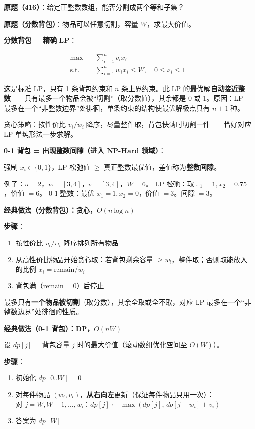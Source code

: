 \documentclass[12pt, a4paper]{ctexart}
\begin{document}
\begin{blackboard}

\textbf{原题（416）}：给定正整数数组，能否分割成两个等和子集？

\textbf{原题（分数背包）}：物品可以任意切割，容量 $W$，求最大价值。

\textbf{分数背包 = 精确 LP}：

\begin{align}
\max \quad & \sum_{i=1}^{n} v_i x_i \\
\text{s.t.} \quad & \sum_{i=1}^{n} w_i x_i \leq W,\quad 0 \leq x_i \leq 1
\end{align}

这是标准 LP，只有 1 条背包约束和 $n$ 条上界约束。此 LP 的最优解\textbf{自动接近整数}——只有最多一个物品会被``切割''（取分数值），其余都是 0 或 1。原因：LP 最多在一个``非整数边界''处徘徊，单条约束的结构使最优解极点只有 $n+1$ 种。

贪心策略：按性价比 $v_i/w_i$ 降序，尽量整件取，背包快满时切割一件——恰好对应 LP 单纯形法一步求解。

\textbf{0-1 背包 = 出现整数间隙（进入 NP-Hard 领域）}：

强制 $x_i \in \{0, 1\}$，LP 松弛值 $\geq$ 真正整数最优值，差值称为\textbf{整数间隙}。

例子：$n=2$，$w = [3, 4]$，$v = [3, 4]$，$W = 6$。
LP 松弛：取 $x_1=1, x_2=0.75$，价值 $= 6$。
0-1 整数：最优 $x_1=1, x_2=0$，价值 $= 3$。间隙 $= 3$。

\textbf{经典做法（分数背包）：贪心，$O(n\log n)$}

\textbf{步骤}：
\begin{enumerate}
    \item 按性价比 $v_i/w_i$ 降序排列所有物品
    \item 从高性价比物品开始贪心取：若背包剩余容量 $\geq w_i$，整件取；否则取能放入的比例 $x_i = \text{remain}/w_i$
    \item 背包满（$\text{remain}=0$）后停止
\end{enumerate}

最多只有\textbf{一个物品被切割}（取分数），其余全取或全不取，对应 LP 最多在一个``非整数边界''处徘徊的性质。

\textbf{经典做法（0-1 背包）：DP，$O(nW)$}

设 $dp[j]$ = 背包容量 $j$ 时的最大价值（滚动数组优化空间至 $O(W)$）。

\textbf{步骤}：
\begin{enumerate}
    \item 初始化 $dp[0..W] = 0$
    \item 对每件物品 $(w_i, v_i)$，\textbf{从右向左}更新（保证每件物品只用一次）：\\
          对 $j = W, W-1, \ldots, w_i$：$dp[j] \leftarrow \max(dp[j],\, dp[j-w_i]+v_i)$
    \item 答案为 $dp[W]$
\end{enumerate}


\end{blackboard}
\end{document}

